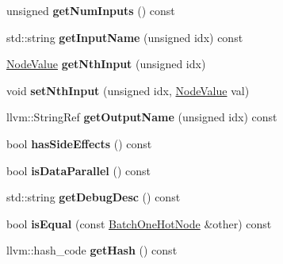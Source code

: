 \begin{DoxyCompactItemize}
unsigned {\bfseries get\+Num\+Inputs} () const
\item 
\mbox{\label{classglow_1_1_batch_one_hot_node_aed3eb23270627aaa427be18899cd3a17}} 
std\+::string {\bfseries get\+Input\+Name} (unsigned idx) const
\item 
\mbox{\label{classglow_1_1_batch_one_hot_node_a4248cc9cd758de981c925f3b5ee8af0b}} 
\hyperlink{structglow_1_1_node_value}{Node\+Value} {\bfseries get\+Nth\+Input} (unsigned idx)
\item 
\mbox{\label{classglow_1_1_batch_one_hot_node_aaaa587bde2672c57187b8ea7b1c314c6}} 
void {\bfseries set\+Nth\+Input} (unsigned idx, \hyperlink{structglow_1_1_node_value}{Node\+Value} val)
\item 
\mbox{\label{classglow_1_1_batch_one_hot_node_a9d8d853a4f71f15eab6f52939ae63dc3}} 
llvm\+::\+String\+Ref {\bfseries get\+Output\+Name} (unsigned idx) const
\item 
\mbox{\label{classglow_1_1_batch_one_hot_node_ae92d18032563260be2542d32d8302d0c}} 
bool {\bfseries has\+Side\+Effects} () const
\item 
\mbox{\label{classglow_1_1_batch_one_hot_node_a8c95c22d3cb0f4b7a1f5ffb04e7f5154}} 
bool {\bfseries is\+Data\+Parallel} () const
\item 
\mbox{\label{classglow_1_1_batch_one_hot_node_a332532eba60798937a634fcbf125ca3b}} 
std\+::string {\bfseries get\+Debug\+Desc} () const
\item 
\mbox{\label{classglow_1_1_batch_one_hot_node_a8b8dbc9cf15368ba84a444a5625b943d}} 
bool {\bfseries is\+Equal} (const \hyperlink{classglow_1_1_batch_one_hot_node}{Batch\+One\+Hot\+Node} \&other) const
\item 
\mbox{\label{classglow_1_1_batch_one_hot_node_a77e496b19bd0168360c0b1d41bdc9b1f}} 
llvm\+::hash\+\_\+code {\bfseries get\+Hash} () const
\item 

\end{DoxyCompactItemize}
